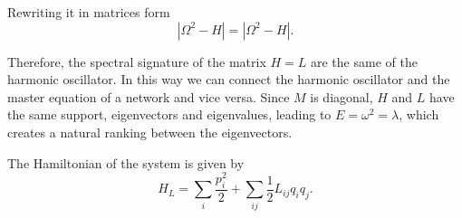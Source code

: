 Rewriting it in matrices form
\begin{equation}
    |\Omega^2 - H| = |\Omega^2 - H|.
\end{equation}

Therefore, the spectral signature of the matrix $H = L$ are the same of the harmonic oscillator. In this way we can connect the harmonic oscillator and the master equation of a network and vice versa. Since $M$ is diagonal, $H$ and $L$ have the same support, eigenvectors and eigenvalues, leading to $E = \omega^2 = \lambda$, which creates a natural ranking between the eigenvectors. 

The Hamiltonian of the system is given by
\begin{equation}\label{H_L}
    H_L = \sum_i \frac{p_i^2}{2} + \sum_{ij} \frac{1}{2}L_{ij}q_iq_j.
\end{equation}



